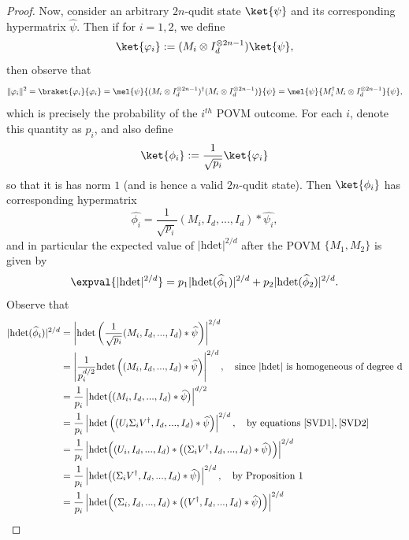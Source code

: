 \documentclass{article}
\begin{document}
\begin{proof}
    Now, consider an arbitrary $2n$-qudit state $\ket{\psi}$ and its corresponding hypermatrix $\widehat{\psi}$. Then if for $i=1,2$, we define 
    \[\ket{\varphi_i} := (M_i\otimes I_d^{\otimes 2n-1})\ket{\psi},\]
    then observe that 
    \[\|\varphi_i\|^2 = \braket{\varphi_i}{\varphi_i} = \mel{\psi}{(M_i\otimes I_d^{\otimes 2n-1})^{\dagger}(M_i\otimes I_d^{\otimes 2n-1})}{\psi} = \mel{\psi}{M_i^{\dagger}M_i\otimes I_d^{\otimes 2n-1}}{\psi},\]
    which is precisely the probability of the $i^{th}$ POVM outcome. For each $i$, denote this quantity as $p_i$, and also define 
    \[\ket{\phi_i} := \frac{1}{\sqrt{p_i}}\ket{\varphi_i}\]
    so that it is has norm $1$ (and is hence a valid $2n$-qudit state). Then $\ket{\phi_i}$ has corresponding hypermatrix
    \[\widehat{\phi_i} = \frac{1}{\sqrt{p_i}}(M_i,I_d,...,I_d)*\widehat{\psi_i},\]
    and in particular the expected value of $|\mathrm{hdet}|^{2/d}$ after the POVM $\{M_1,M_2\}$ is given by
    \begin{equation}\label{expected value}
        \expval{|\mathrm{hdet}|^{2/d}} = p_1|\mathrm{hdet}(\widehat{\phi}_1)|^{2/d}+p_2|\mathrm{hdet}(\widehat{\phi}_2)|^{2/d}.
    \end{equation}
    Observe that
    \begin{align*}
        |\mathrm{hdet}(\widehat{\phi}_i)|^{2/d} &= \left|\mathrm{hdet}\left(\frac{1}{\sqrt{p_i}}(M_i,I_d,...,I_d)*\widehat{\psi}\right)\right|^{2/d} \\
        &= \left|\frac{1}{p_i^{d/2}}\mathrm{hdet}\left((M_i,I_d,...,I_d)*\widehat{\psi}\right)\right|^{2/d},\quad \text{since }|\mathrm{hdet}|\text{ is homogeneous of degree d} \\ 
        &= \frac{1}{p_i}\left|\mathrm{hdet}\big((M_i,I_d,...,I_d)*\widehat{\psi}\big)\right|^{d/2} \\
        &=  \frac{1}{p_i}\left|\mathrm{hdet}\left((U_i\Sigma_iV^{\dagger},I_d,...,I_d)*\widehat{\psi}\right)\right|^{2/d},\quad \text{by equations }\eqref{SVD1},\eqref{SVD2} \\
        &= \frac{1}{p_i}\left|\mathrm{hdet}\Big((U_i,I_d,...,I_d)*\big((\Sigma_iV^{\dagger},I_d,...,I_d)*\widehat{\psi}\big)\Big)\right|^{2/d} \\
        &= \frac{1}{p_i}\left|\mathrm{hdet}\big((\Sigma_iV^{\dagger},I_d,...,I_d)*\widehat{\psi}\big)\right|^{2/d},\quad \text{by Proposition 1} \\
        &= \frac{1}{p_i}\left|\mathrm{hdet}\Big((\Sigma_i,I_d,...,I_d)*\big((V^{\dagger},I_d,...,I_d)*\widehat{\psi}\big)\Big)\right|^{2/d} \\

\end{align*}
\end{proof}
\end{document}
